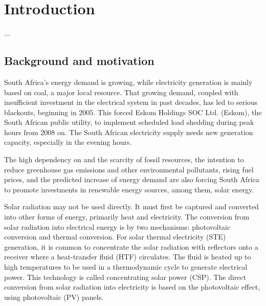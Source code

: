 \chapter{Introduction}
... %

\section{Background and motivation}

South Africa's energy demand is growing, while electricity generation is mainly based on coal, a major local resource. That growing demand, coupled with insufficient investment in the electrical system in past decades, has led to serious blackouts, beginning in 2005. This forced Eskom Holdings SOC Ltd. (Eskom), the South African public utility, to implement scheduled load shedding during peak hours from 2008 on. The South African electricity supply needs new generation capacity, especially in the evening hours. 


The high dependency on and the scarcity of fossil resources, the intention to reduce greenhouse gas emissions and other environmental pollutants, rising fuel prices, and the predicted increase of energy demand are also forcing South Africa to promote investments in renewable energy sources, among them, solar energy.

Solar radiation may not be used directly. It must first be captured and converted into other forms of energy, primarily heat and electricity. The conversion from solar radiation into electrical energy is by two mechanisms: photovoltaic conversion and thermal conversion. For solar thermal electricity (STE) generation, it is common to concentrate the solar radiation with reflectors onto a receiver where a heat-transfer fluid (HTF) circulates. The fluid is heated up to high temperatures to be used in a thermodynamic cycle to generate electrical power. This technology is called concentrating solar power (CSP). The direct conversion from solar radiation into electricity is based on the photovoltaic effect, using photovoltaic (PV) panels. 

